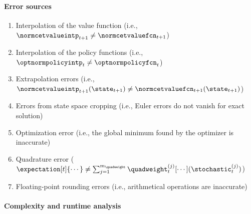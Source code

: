 
\dummytext[3]{}

\paragraph{Error sources}


\begin{enumerate}
  \item
  Interpolation of the value function
  (i.e., $\normcetvalueintp_{t+1} \not= \normcetvaluefcn_{t+1}$)
  
  \item
  Interpolation of the policy functions
  (i.e., $\optnormpolicyintp_t \not= \optnormpolicyfcn_t$)
  
  \item
  Extrapolation errors
  (i.e., $
    \normcetvalueintp_{t+1}(\state_{t+1})
    \not= \normcetvaluefcn_{t+1}(\state_{t+1})
  $)
  
  \item
  Errors from state space cropping
  (i.e., Euler errors do not vanish for exact solution)
  
  \item
  Optimization error
  (i.e., the global minimum found by the optimizer is inaccurate)
  
  \item
  Quadrature error
  ($
    \expectation[t]{\cdots}
    \not= \sum_{j=1}^{m_{\quadweight}} \quadweight_t^{(j)}
    [\cdots](\stochastic_t^{(j)})
  $)
  
  \item
  Floating-point rounding errors
  (i.e., arithmetical operations are inaccurate)
\end{enumerate}

\dummytext[2]{}

\paragraph{Complexity and runtime analysis}


%
%

